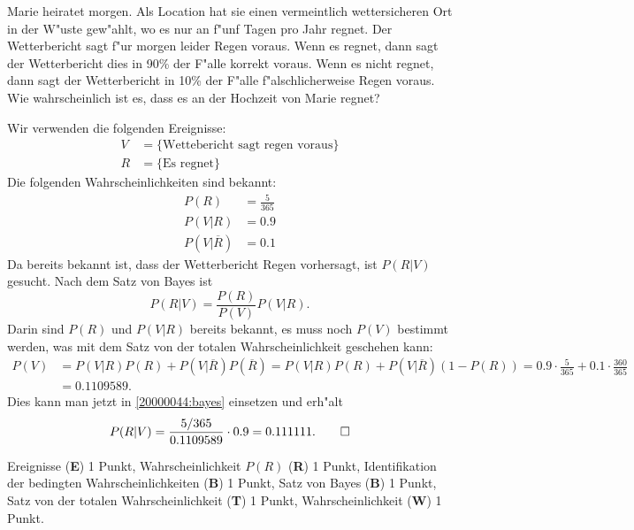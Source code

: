 Marie heiratet morgen.
Als Location hat sie einen vermeintlich wettersicheren Ort in 
der W"uste gew"ahlt, wo es nur an f"unf Tagen pro Jahr regnet.
Der Wetterbericht sagt f"ur morgen leider Regen voraus.
Wenn es regnet, dann sagt der Wetterbericht dies in 90\% der F"alle
korrekt voraus.
Wenn es nicht regnet, dann sagt der Wetterbericht in 10\% der F"alle
f"alschlicherweise Regen voraus.
Wie wahrscheinlich ist es, dass es an der Hochzeit von Marie regnet?


\begin{loesung}
Wir verwenden die folgenden Ereignisse:
\begin{align*}
V&=\{\text{Wettebericht sagt regen voraus}\}\\
R&=\{\text{Es regnet}\}
\end{align*}
Die folgenden Wahrscheinlichkeiten sind bekannt:
\begin{align*}
P(R)
&=
\frac{5}{365}
\\
P(V|R)
&=
0.9
\\
P(V|\overline{R})
&=
0.1
\end{align*}
Da bereits bekannt ist, dass der Wetterbericht Regen vorhersagt, ist
$P(R|V)$ gesucht.
Nach dem Satz von Bayes ist
\begin{equation}
P(R|V)
=
\frac{P(R)}{P(V)}P(V|R).
\label{20000044:bayes} 
\end{equation}
Darin sind $P(R)$ und $P(V|R)$ bereits bekannt, es muss noch $P(V)$ bestimmt
werden, was mit dem Satz von der totalen Wahrscheinlichkeit geschehen kann:
\begin{align*}
P(V)
&=
P(V|R)P(R)+P(V|\overline{R})P(\overline{R})
=
P(V|R)P(R)+P(V|\overline{R})(1-P(R))
=
0.9\cdot\frac{5}{365}+0.1\cdot\frac{360}{365}
\\
&=
0.1109589.
\end{align*}
Dies kann man jetzt in \eqref{20000044:bayes} einsetzen und erh"alt
\[
P(R|V)
=
\frac{5/365}{0.1109589}\cdot 0.9
=
0.111111.
\qedhere
\]
\end{loesung}

\begin{bewertung}
Ereignisse ({\bf E}) 1 Punkt,
Wahrscheinlichkeit $P(R)$ ({\bf R}) 1 Punkt,
Identifikation der bedingten Wahrscheinlichkeiten ({\bf B}) 1 Punkt,
Satz von Bayes ({\bf B}) 1 Punkt,
Satz von der totalen Wahrscheinlichkeit ({\bf T}) 1 Punkt,
Wahrscheinlichkeit ({\bf W}) 1 Punkt.
\end{bewertung}

